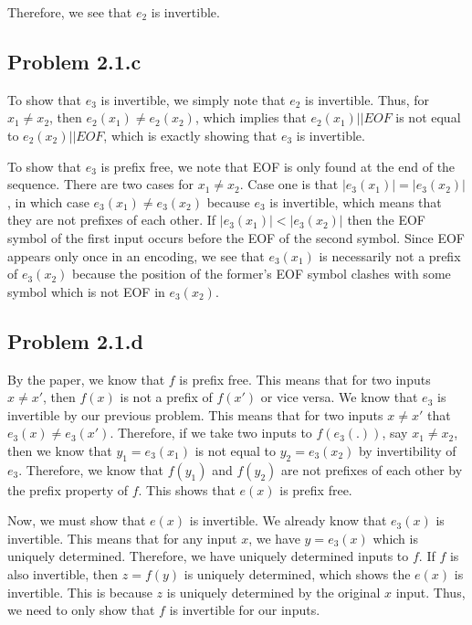 \documentclass[psamsfonts]{amsart}
\begin{document}
Therefore, we see that $e_2$ is invertible.

\subsection*{Problem 2.1.c}

To show that $e_3$ is invertible, we simply note that $e_2$ is invertible. Thus, for $x_1 \neq x_2$, then $e_2(x_1) \neq e_2(x_2)$, which implies that $e_2(x_1) || EOF$ is not equal to $e_2(x_2) || EOF$, which is exactly showing that $e_3$ is invertible.

To show that $e_3$ is prefix free, we note that EOF is only found at the end of the sequence. There are two cases for $x_1 \neq x_2$. Case one is that $|e_3(x_1)| = |e_3(x_2)|$, in which case $e_3(x_1) \neq e_3(x_2)$ because $e_3$ is invertible, which means that they are not prefixes of each other. If $|e_3(x_1)| < |e_3(x_2)|$ then the EOF symbol of the first input occurs before the EOF of the second symbol. Since EOF appears only once in an encoding, we see that $e_3(x_1)$ is necessarily not a prefix of $e_3(x_2)$ because the position of the former's EOF symbol clashes with some symbol which is not EOF in $e_3(x_2)$.

\subsection*{Problem 2.1.d}

By the paper, we know that $f$ is prefix free. This means that for two inputs $x \neq x'$, then $f(x)$ is not a prefix of $f(x')$ or vice versa. We know that $e_3$ is invertible by our previous problem. This means that for two inputs $x \neq x'$ that $e_3(x) \neq e_3(x')$. Therefore, if we take two inputs to $f(e_3(.))$, say $x_1 \neq x_2$, then we know that $y_1 = e_3(x_1)$ is not equal to $y_2 = e_3(x_2)$ by invertibility of $e_3$. Therefore, we know that $f(y_1)$ and $f(y_2)$ are not prefixes of each other by the prefix property of $f$. This shows that $e(x)$ is prefix free.

Now, we must show that $e(x)$ is invertible. We already know that $e_3(x)$ is invertible. This means that for any input $x$, we have $y = e_3(x)$ which is uniquely determined. Therefore, we have uniquely determined inputs to $f$. If $f$ is also invertible, then $z = f(y)$ is uniquely determined, which shows the $e(x)$ is invertible. This is because $z$ is uniquely determined by the original $x$ input. Thus, we need to only show that $f$ is invertible for our inputs.
\end{document}
